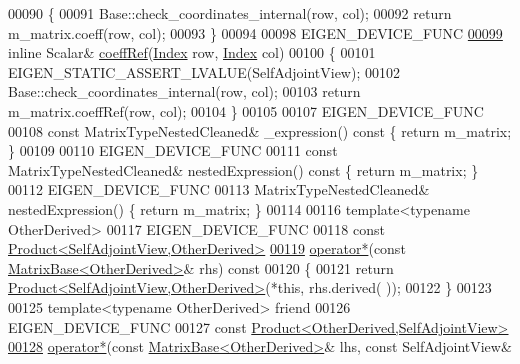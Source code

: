 \begin{DoxyCode}
00090 \textcolor{keyword}{    }\{
00091       Base::check\_coordinates\_internal(row, col);
00092       \textcolor{keywordflow}{return} m\_matrix.coeff(row, col);
00093     \}
00094 
00098     EIGEN\_DEVICE\_FUNC
\hyperlink{group___core___module_a1f0c389753a56b97bbb26dcab820f111}{00099}     \textcolor{keyword}{inline} Scalar& \hyperlink{group___core___module_a1f0c389753a56b97bbb26dcab820f111}{coeffRef}(\hyperlink{group___core___module_a554f30542cc2316add4b1ea0a492ff02}{Index} row, \hyperlink{group___core___module_a554f30542cc2316add4b1ea0a492ff02}{Index} col)
00100     \{
00101       EIGEN\_STATIC\_ASSERT\_LVALUE(SelfAdjointView);
00102       Base::check\_coordinates\_internal(row, col);
00103       \textcolor{keywordflow}{return} m\_matrix.coeffRef(row, col);
00104     \}
00105 
00107     EIGEN\_DEVICE\_FUNC
00108     \textcolor{keyword}{const} MatrixTypeNestedCleaned& \_expression()\textcolor{keyword}{ const }\{ \textcolor{keywordflow}{return} m\_matrix; \}
00109 
00110     EIGEN\_DEVICE\_FUNC
00111     \textcolor{keyword}{const} MatrixTypeNestedCleaned& nestedExpression()\textcolor{keyword}{ const }\{ \textcolor{keywordflow}{return} m\_matrix; \}
00112     EIGEN\_DEVICE\_FUNC
00113     MatrixTypeNestedCleaned& nestedExpression() \{ \textcolor{keywordflow}{return} m\_matrix; \}
00114 
00116     \textcolor{keyword}{template}<\textcolor{keyword}{typename} OtherDerived>
00117     EIGEN\_DEVICE\_FUNC
00118     \textcolor{keyword}{const} \hyperlink{group___core___module_class_eigen_1_1_product}{Product<SelfAdjointView,OtherDerived>}
\hyperlink{group___core___module_a726e801c8867ce4ec11317fd6034069b}{00119}     \hyperlink{group___core___module_a726e801c8867ce4ec11317fd6034069b}{operator*}(\textcolor{keyword}{const} \hyperlink{group___core___module_class_eigen_1_1_matrix_base}{MatrixBase<OtherDerived>}& rhs)\textcolor{keyword}{ const}
00120 \textcolor{keyword}{    }\{
00121       \textcolor{keywordflow}{return} \hyperlink{group___core___module_class_eigen_1_1_product}{Product<SelfAdjointView,OtherDerived>}(*\textcolor{keyword}{this}, rhs.derived(
      ));
00122     \}
00123 
00125     \textcolor{keyword}{template}<\textcolor{keyword}{typename} OtherDerived> \textcolor{keyword}{friend}
00126     EIGEN\_DEVICE\_FUNC
00127     \textcolor{keyword}{const} \hyperlink{group___core___module_class_eigen_1_1_product}{Product<OtherDerived,SelfAdjointView>}
\hyperlink{group___core___module_ade82565a894a08671879228863881f84}{00128}     \hyperlink{group___core___module_ade82565a894a08671879228863881f84}{operator*}(\textcolor{keyword}{const} \hyperlink{group___core___module_class_eigen_1_1_matrix_base}{MatrixBase<OtherDerived>}& lhs, \textcolor{keyword}{const} SelfAdjointView& 

\end{DoxyCode}
